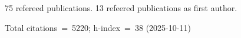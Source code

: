 75 refereed publications. 13 refeered publications as first author.

Total citations~=~5220; h-index~=~38 (2025-10-11)